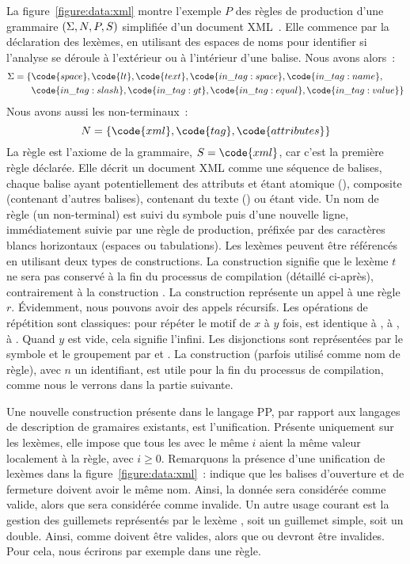 La figure~\ref{figure:data:xml} montre l'exemple $P$ des règles de production
d'une grammaire $(\Sigma, N, P, \-S)$ simplifiée d'un document XML~.
Elle commence par la déclaration des lexèmes, en utilisant des espaces de noms
pour identifier si l'analyse se déroule à l'extérieur ou à l'intérieur d'une
balise. Nous avons alors~:
%
\begin{align*} \Sigma = \{ & \code{space}, \code{lt}, \code{text},
\code{in\_tag:space}, \code{in\_tag:name}, \\ & \code{in\_tag:slash},
\code{in\_tag:gt}, \code{in\_tag:equal}, \code{in\_tag:value} \} \end{align*}
%
Nous avons aussi les non-terminaux~:
%
$$N = \{\code{xml}, \code{tag}, \code{attributes}\}$$
%
La règle  est l'axiome de la grammaire, $S = \code{xml}$, car c'est la
première règle déclarée. Elle décrit un document XML comme une séquence de
balises, chaque balise ayant potentiellement des attributs et étant atomique
(), composite (contenant d'autres balises), contenant du texte
() ou étant vide. Un nom de règle (un non-terminal)
est suivi du symbole \code{:} puis d'une nouvelle ligne, immédiatement suivie
par une règle de production, préfixée par des caractères blancs horizontaux
(espaces ou tabulations). Les lexèmes peuvent être référencés en utilisant deux
types de constructions. La construction  signifie que le lexème
$t$ ne sera pas conservé à la fin du processus de compilation (détaillé
ci-après), contrairement à la construction . La construction
 représente un appel à une règle $r$. Évidemment, nous pouvons avoir
des appels récursifs. Les opérations de répétition sont classiques:  pour répéter le motif de $x$ à $y$ fois,  est identique à
, \code{+} à , \code{*} à . Quand $y$
est vide, cela signifie l'infini. Les disjonctions sont représentées par le
symbole \code{\mvert} et le groupement par \code{(} et \code{)}. La construction
 (parfois utilisé comme nom de règle), avec $n$ un identifiant, est
utile pour la fin du processus de compilation, comme nous le verrons dans la
partie suivante.

Une nouvelle construction présente dans le langage PP, par rapport aux langages
de description de gramaires existants, est l'unification. Présente uniquement
sur les lexèmes, elle impose que tous les  avec le même $i$ aient
la même valeur localement à la règle, avec $i \geq 0$.  Remarquons la présence
d'une unification de lexèmes dans la figure~\ref{figure:data:xml}~:
 indique que les balises d'ouverture et de fermeture doivent avoir
le même nom. Ainsi, la donnée  sera considérée comme valide,
alors que  sera considérée comme invalide. Un autre usage
courant est la gestion des guillemets représentés par le lexème , soit un guillemet simple, soit un double. Ainsi,  comme
 doivent être valides, alors que  ou  devront être
invalides. Pour cela, nous écrirons par exemple  dans une règle.

